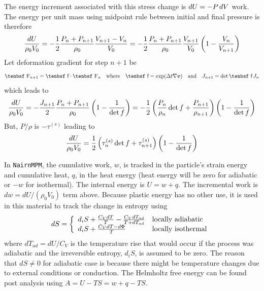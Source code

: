 \documentclass[11pt]{article}
\renewcommand{\vec}[1]{\boldsymbol{#1}}
\def\f{\hbox{\tenbsf f}}
\def\F{\hbox{\tenbsf F}}
\begin{document}
The energy increment associated with this stress change is $dU = -P\thinspace dV$ work. The energy per unit mass using midpoint rule between initial and final pressure is therefore
\begin{equation}
    {dU\over \rho_0 V_0} = - {1\over2} {P_n+P_{n+1}\over \rho_0} 
         {V_{n+1} - V_n\over V_0} = - {1\over2} {P_n+P_{n+1}\over \rho_0} {V_{n+1}\over V_0}
         \left(1 - {V_n\over V_{n+1}}\right)
\end{equation}
Let deformation gradient for step $n+1$ be
\begin{equation}
       \F_{n+1} = \f\cdot\F_n  \quad{\rm where}\quad \f = \exp(\Delta t\nabla\vec v)
       \quad{\rm and}\quad J_{n+1} = \det \f \thinspace J_n
\end{equation}
which leads to
\begin{equation}
    {dU\over \rho_0 V_0} = - {J_{n+1}\over2} {P_n+P_{n+1}\over \rho_0} 
         \left(1 - {1\over\det f}\right) = - {1\over2}
         \left({P_n\over \rho_{n}}\det f+{P_{n+1}\over \rho_{n+1}} \right)
         \left(1 - {1\over\det f}\right)
\end{equation}
But, $P/\rho$ is $-\tau^{(s)}$ leading to
\begin{equation}
    {dU\over \rho_0 V_0} =  {1\over2}
         \left(\tau_n^{(s)}\det f+\tau_{n+1}^{(s)} \right)
         \left(1 - {1\over\det f}\right)
\end{equation}

In {\tt NairnMPM}, the cumulative work, $w$, is tracked in the particle's strain energy and cumulative heat, $q$, in the heat energy (heat energy will be zero for adiabatic or $-w$  for isothermal). The internal energy is $U = w + q$. The incremental work is $dw = dU/(\rho_0 V_0)$ term above. Because plastic energy has no other use, it is used in this material to track the change in entropy using
\begin{equation}
      dS =\left\{ \begin{array}{ll}
                d_iS + {C_V dT\over T} - {C_V dT_{ad}\over T + dT_{ad}} & {\rm locally\ adiabatic} \\
                d_iS + {C_V dT-d\Phi\over T} & {\rm locally\ isothermal}
                \end{array} \right. \\
\end{equation}
where $dT_{ad} = dU/C_V$ is the temperature rise that would occur if the process was adiabatic and the irreversible entropy, $d_iS$, is assumed to be zero. The reason that $dS\ne0$ for adiabatic case is because there might be temperature changes due to external conditions or conduction. The Helmholtz free energy can be found post analysis using $A = U - TS = w + q - TS$.
\end{document}
